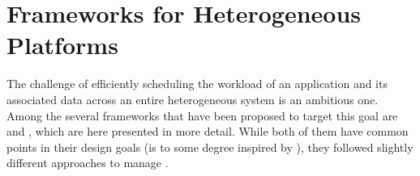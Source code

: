\documentclass[main.tex]{subfiles}
\begin{document}
\chapter{Frameworks for Heterogeneous Platforms} \label{chapter:frameworks}

The challenge of efficiently scheduling the workload of an application and its associated data across an entire heterogeneous system is an ambitious one. Among the several frameworks that have been proposed to target this goal are \gama and \starpu, which are here presented in more detail.
While both of them have common points in their design goals (\gama is to some degree inspired by \starpu), they followed slightly different approaches to manage \hetplats.






\end{document}
